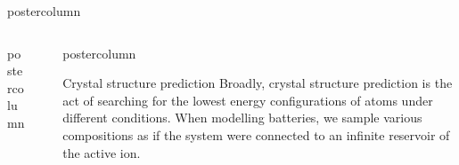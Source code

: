 \documentclass{beamer}
\newlength{\columnheight}
\begin{document}
\begin{frame}
\begin{columns}
\begin{column}{.57\textwidth}
\begin{beamercolorbox}[center]{postercolumn}
\begin{minipage}{.98\textwidth}
{\begin{columns}
\begin{column}{.48\textwidth}
\begin{beamercolorbox}[left]{postercolumn}
\begin{minipage}{\textwidth}
{
		}\end{minipage}\end{beamercolorbox}
	\end{column}
  \begin{column}{.00\textwidth}
    \end{column}
  \begin{column}{.48\textwidth}
		\begin{beamercolorbox}[right]{postercolumn}
			\begin{minipage}{\textwidth} %
				\parbox[t][\columnheight]{\textwidth}{ %
					\begin{myblock}{Crystal structure prediction}
              Broadly, crystal structure prediction is the act of searching for the lowest energy configurations of atoms under different conditions. When modelling batteries, we sample various compositions as if the system were connected to an infinite reservoir of the active ion.
              

\end{myblock}}
\end{minipage}
\end{beamercolorbox}
\end{column}
\end{columns}}
\end{minipage}
\end{beamercolorbox}
\end{column}
\end{columns}
\end{frame}
\end{document}

